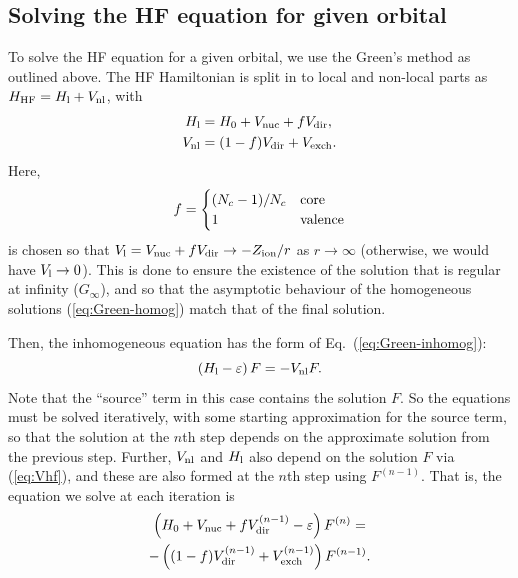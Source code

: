 \documentclass[10pt,twocolumn,a4paper]{article}%
\newcommand{\be}{\begin{equation}}
\newcommand{\ee}{\end{equation}}
\def\en{\ensuremath{\varepsilon}}
\begin{document}
\subsection{Solving the HF equation for given orbital}\label{sec:hf-orbital}

To solve the HF equation for a given orbital, we use the Green's method as outlined above.
The HF Hamiltonian is
split in to local and non-local parts as $H_{\rm HF} = H_{\rm l}+V_{\rm nl}$, with
\begin{align}
H_{\rm l} &= H_0 + V_{\rm nuc}+fV_{\rm dir},\\
V_{\rm nl} &= (1-f)V_{\rm dir}+V_{\rm exch}.
\end{align}
Here,
\be
f=
\begin{cases}
(N_c - 1)/N_c & {\rm core} \\
 1 & {\rm valence}
\end{cases}
\ee
is chosen so that $V_{\rm l} = V_{\rm nuc} +f V_{\rm dir}\to -Z_{\rm ion}/r$ as $r\to\infty$ (otherwise, we would have $V_{\rm l}\to0$).
This is done to ensure the existence of the solution that is regular at infinity ($G_\infty$), and so that the asymptotic behaviour of the homogeneous solutions (\ref{eq:Green-homog})  match that of the final solution.


Then, the inhomogeneous equation has the form of Eq.~(\ref{eq:Green-inhomog}):
\be
\left( H_{\rm l}- \en\right)F = -V_{\rm nl}F.
\ee
Note that the ``source'' term in this case contains the solution $F$.
So the equations must be solved iteratively, with some starting approximation for the source term, so that the solution at the $n$th step depends on the approximate solution from the previous step.
Further, $V_{\rm nl}$ and $H_{\rm l}$ also depend on the solution $F$ via (\ref{eq:Vhf}), and these are also formed at the $n$th step using $F^{(n-1)}$.
That is, the equation we solve at each iteration is
\begin{multline}\label{eq:inhomog-HF}
\left( H_0 + V_{\rm nuc} + fV_{\rm dir}^{(n-1)} - \en\right)F^{(n)} =
\\
 -\left( (1-f)V_{\rm dir}^{(n-1)}+V_{\rm exch}^{(n-1)} \right)F^{(n-1)}.
\end{multline}
\end{document}
